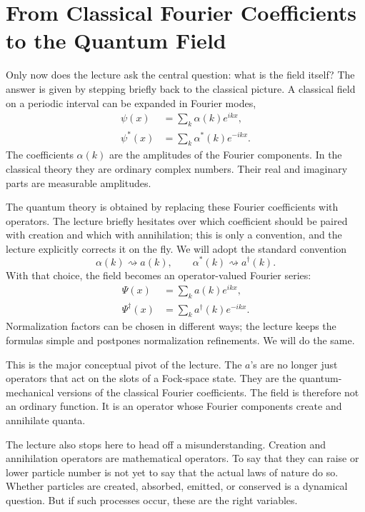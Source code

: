 \section{From Classical Fourier Coefficients to the Quantum Field}

Only now does the lecture ask the central question: what is the field itself? The answer is given by stepping briefly back to the classical picture. A classical field on a periodic interval can be expanded in Fourier modes,
\begin{align}
\psi(x) &= \sum_k \alpha(k)e^{ikx},
\\
\psi^\ast(x) &= \sum_k \alpha^\ast(k)e^{-ikx}.
\end{align}
The coefficients \(\alpha(k)\) are the amplitudes of the Fourier components. In the classical theory they are ordinary complex numbers. Their real and imaginary parts are measurable amplitudes.

The quantum theory is obtained by replacing these Fourier coefficients with operators. The lecture briefly hesitates over which coefficient should be paired with creation and which with annihilation; this is only a convention, and the lecture explicitly corrects it on the fly. We will adopt the standard convention
\begin{equation}
\alpha(k)\rightsquigarrow a(k),
\qquad
\alpha^\ast(k)\rightsquigarrow a^\dagger(k).
\end{equation}
With that choice, the field becomes an operator-valued Fourier series:
\begin{align}
\Psi(x) &= \sum_k a(k)e^{ikx},
\\
\Psi^\dagger(x) &= \sum_k a^\dagger(k)e^{-ikx}.
\end{align}
Normalization factors can be chosen in different ways; the lecture keeps the formulas simple and postpones normalization refinements. We will do the same.

This is the major conceptual pivot of the lecture. The \(a\)'s are no longer just operators that act on the slots of a Fock-space state. They are the quantum-mechanical versions of the classical Fourier coefficients. The field is therefore not an ordinary function. It is an operator whose Fourier components create and annihilate quanta.

The lecture also stops here to head off a misunderstanding. Creation and annihilation operators are mathematical operators. To say that they can raise or lower particle number is not yet to say that the actual laws of nature do so. Whether particles are created, absorbed, emitted, or conserved is a dynamical question. But if such processes occur, these are the right variables.

